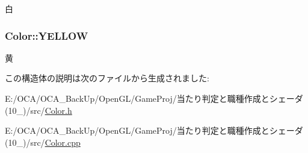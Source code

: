 白 

\hypertarget{struct_color_ad7b2412aba74d8d4b5e6d6dc7627264d}{
\subsubsection[{Y\-E\-L\-L\-O\-W}]{ Color\-::\-Y\-E\-L\-L\-O\-W\hspace{0.3cm}{\ttfamily [static]}}}\label{struct_color_ad7b2412aba74d8d4b5e6d6dc7627264d}


黄 



この構造体の説明は次のファイルから生成されました\-:\begin{DoxyCompactItemize}
\item 
E\-:/\-O\-C\-A/\-O\-C\-A\-\_\-\-Back\-Up/\-Open\-G\-L/\-Game\-Proj/当たり判定と職種作成とシェーダ(10\-\_)/src/\hyperlink{_color_8h}{Color.\-h}\item 
E\-:/\-O\-C\-A/\-O\-C\-A\-\_\-\-Back\-Up/\-Open\-G\-L/\-Game\-Proj/当たり判定と職種作成とシェーダ(10\-\_)/src/\hyperlink{_color_8cpp}{Color.\-cpp}\end{DoxyCompactItemize}
